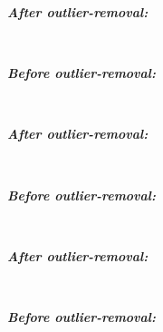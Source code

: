 \documentclass[11pt, a4paper , landscape]{article}
\begin{document}
    \textbf{\emph{After outlier-removal:}}

    
    \begin{center}
    \end{center}
    { \hspace*{\fill} \\}
    
    \textbf{\emph{Before outlier-removal:}}

    
    \begin{center}
    \end{center}
    { \hspace*{\fill} \\}
    
    \textbf{\emph{After outlier-removal:}}

    
    \begin{center}
    \end{center}
    { \hspace*{\fill} \\}
    
    \textbf{\emph{Before outlier-removal:}}

    
    \begin{center}
    \end{center}
    { \hspace*{\fill} \\}
    
    \textbf{\emph{After outlier-removal:}}

    
    \begin{center}
    \end{center}
    { \hspace*{\fill} \\}
    
    \textbf{\emph{Before outlier-removal:}}

    
    \begin{center}
    \end{center}
    { \hspace*{\fill} \\}
    
\end{document}
